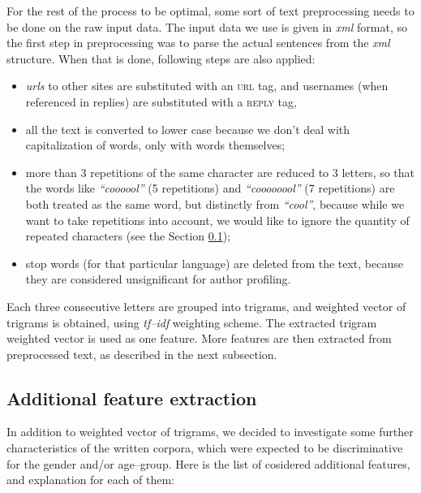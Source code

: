 \documentclass[10pt, a4paper]{article}
\begin{document}
For the rest of the process to be optimal, some sort of text preprocessing needs to be done on the raw input data.
The input data we use is given in \textit{xml} format, so the first step in preprocessing was to parse the actual sentences from the \textit{xml} structure.
When that is done, following steps are also applied:
\begin{itemize}
	\item \textit{urls} to other sites are substituted with an \textsc{url} tag, and usernames (when referenced in replies) are substituted with a \textsc{reply} tag,
	\item all the text is converted to lower case because we don't deal with capitalization of words, only with words themselves;
	\item more than 3 repetitions of the same character are reduced to 3 letters, so that the words like \textit{``coooool''} (5 repetitions) and \textit{``coooooool''} (7 repetitions) are both treated as the same word, but distinctly from \textit{``cool''}, because while we want to take repetitions into account, we would like to ignore the quantity of repeated characters (see the Section \ref{sec:features});
	\item stop words (for that particular language) are deleted from the text, because they are considered unsignificant for author profiling.
\end{itemize}

Each three consecutive letters are grouped into trigrams, and weighted vector of trigrams is obtained, using \textit{tf--idf} weighting scheme.
The extracted trigram weighted vector is used as one feature.
More features are then extracted from preprocessed text, as described in the next subsection.

\subsection{Additional feature extraction}
\label{sec:features}
In addition to weighted vector of trigrams, we decided to investigate some further characteristics of the written corpora, which were expected to be discriminative for the gender and/or age--group.
Here is the list of cosidered additional features, and explanation for each of them:
\end{document}
